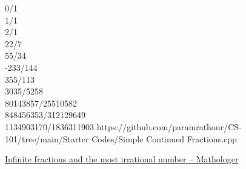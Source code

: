 \documentclass[../../Problems]{subfiles}
\begin{document}
{\begin{testcases}
	{0/1\\1/1\\2/1\\22/7\\55/34\\-233/144\\355/113\\3035/5258\\80143857/25510582\\848456353/312129649\\1134903170/1836311903}
	{https://github.com/paramrathour/CS-101/tree/main/Starter Codes/Simple Continued Fractions.cpp}
\end{testcases}
\begin{funvideo}
\href{https://youtu.be/CaasbfdJdJg}{Infinite fractions and the most irrational number -- Mathologer}
\end{funvideo}
}
\end{document}
